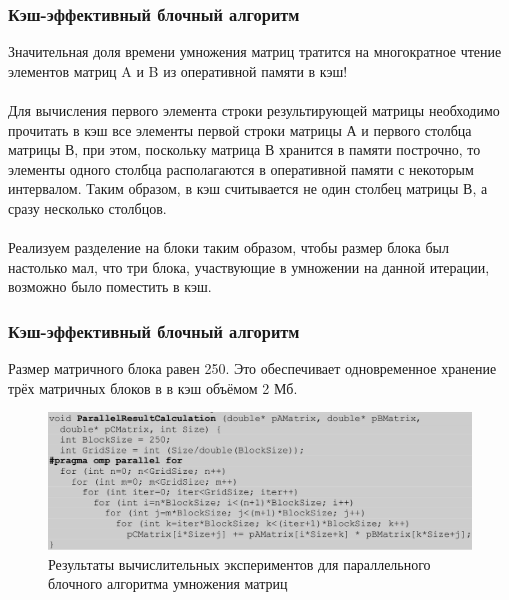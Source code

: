 \documentclass{beamer}
\begin{document}
\begin{frame}
\frametitle{Кэш-эффективный блочный алгоритм}

Значительная доля времени умножения матриц тратится на многократное чтение элементов матриц A и B из оперативной памяти в кэш!\\~\\

Для вычисления первого элемента строки результирующей матрицы необходимо прочитать в кэш все элементы первой строки матрицы А и первого столбца матрицы В, при этом, поскольку матрица В хранится в памяти построчно, то элементы одного столбца располагаются в оперативной памяти с некоторым интервалом. Таким образом, в кэш считывается не один столбец матрицы В, а сразу несколько столбцов.\\~\\

Реализуем разделение на блоки таким образом, чтобы размер блока был настолько мал, что три блока, участвующие в умножении на данной итерации, возможно было поместить в кэш.

\end{frame}


\begin{frame}
\frametitle{Кэш-эффективный блочный алгоритм}

Размер матричного блока равен 250. Это обеспечивает одновременное хранение трёх матричных блоков в в кэш объёмом 2 Мб.

\begin{figure}
\includegraphics[scale=0.25]{res/pic015}
\caption{Результаты вычислительных экспериментов для параллельного блочного алгоритма умножения матриц}
\end{figure}

\end{frame}

\end{document}
